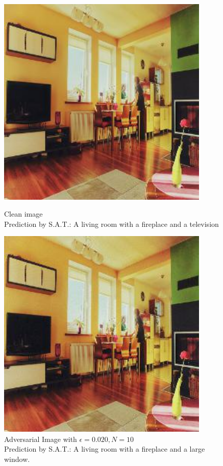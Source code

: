 \begin{figure}[ht]
    \centering
    \begin{minipage}{0.45\textwidth}
        \centering
        \includegraphics[width=0.9\textwidth]{../code/ShowDistractAndDeceive/samples/0.000/img_0.jpg} %
        \caption*{Clean image\\Prediction by S.A.T.: A living room with a fireplace and a television}
    \end{minipage}\hfill
    \begin{minipage}{0.45\textwidth}
        \centering
        \includegraphics[width=0.9\textwidth]{../code/ShowDistractAndDeceive/samples/0.020/img_0.jpg} %
        \caption*{Adversarial Image with $\epsilon=0.020, N=10$\\Prediction by S.A.T.: A living room with a fireplace and a large window.}
    \end{minipage}
\end{figure}

